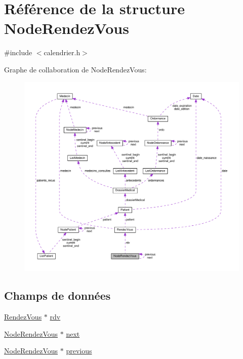 \hypertarget{struct_node_rendez_vous}{\section{Référence de la structure Node\-Rendez\-Vous}
\label{struct_node_rendez_vous}
}


{\ttfamily \#include $<$calendrier.\-h$>$}



Graphe de collaboration de Node\-Rendez\-Vous\-:
\nopagebreak
\begin{figure}[H]
\begin{center}
\leavevmode
\includegraphics[width=350pt]{struct_node_rendez_vous__coll__graph}
\end{center}
\end{figure}
\subsection*{Champs de données}
\begin{DoxyCompactItemize}
\item 
\hyperlink{struct_rendez_vous}{Rendez\-Vous} $\ast$ \hyperlink{struct_node_rendez_vous_af79db64558cdbcd5406072274edcc1b5}{rdv}
\item 
\hyperlink{struct_node_rendez_vous}{Node\-Rendez\-Vous} $\ast$ \hyperlink{struct_node_rendez_vous_a84662a2ba345d017dd59a013b040e53e}{next}
\item 
\hyperlink{struct_node_rendez_vous}{Node\-Rendez\-Vous} $\ast$ \hyperlink{struct_node_rendez_vous_ab9f2e3f151f5b84ed16f14e554374470}{previous}
\end{DoxyCompactItemize}


